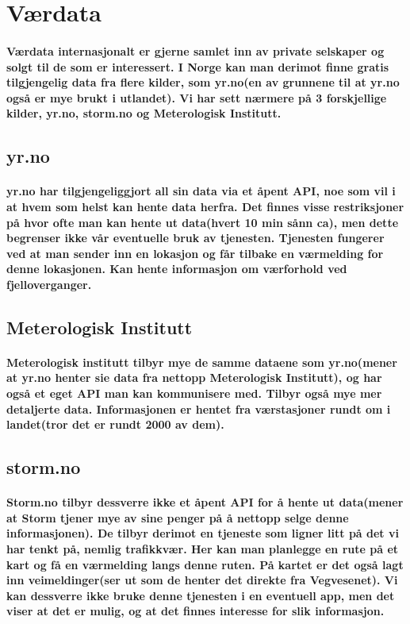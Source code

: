 \section{Værdata}
\paragraph{Værdata internasjonalt er gjerne samlet inn av private selskaper og solgt til de som er interessert. I Norge kan man derimot finne gratis tilgjengelig data fra flere kilder, som yr.no(en av grunnene til at yr.no også er mye brukt i utlandet). Vi har sett nærmere på 3 forskjellige kilder, yr.no, storm.no og Meterologisk Institutt.}

\subsection{yr.no}
\paragraph{yr.no har tilgjengeliggjort all sin data via et åpent API, noe som vil i at hvem som helst kan hente data herfra. Det finnes visse restriksjoner på hvor ofte man kan hente ut data(hvert 10 min sånn ca), men dette begrenser ikke vår eventuelle bruk av tjenesten. Tjenesten fungerer ved at man sender inn en lokasjon og får tilbake en værmelding for denne lokasjonen. Kan hente informasjon om værforhold ved fjelloverganger.}

\subsection{Meterologisk Institutt}
\paragraph{Meterologisk institutt tilbyr mye de samme dataene som yr.no(mener at yr.no henter sie data fra nettopp Meterologisk Institutt), og har også et eget API man kan kommunisere med. Tilbyr også mye mer detaljerte data. Informasjonen er hentet fra værstasjoner rundt om i landet(tror det er rundt 2000 av dem).}

\subsection{storm.no}
\paragraph{Storm.no tilbyr dessverre ikke et åpent API for å hente ut data(mener at Storm tjener mye av sine penger på å nettopp selge denne informasjonen). De tilbyr derimot en tjeneste som ligner litt på det vi har tenkt på, nemlig trafikkvær. Her kan man planlegge en rute på et kart og få en værmelding langs denne ruten. På kartet er det også lagt inn veimeldinger(ser ut som de henter det direkte fra Vegvesenet). Vi kan dessverre ikke bruke denne tjenesten i en eventuell app, men det viser at det er mulig, og at det finnes interesse for slik informasjon.}